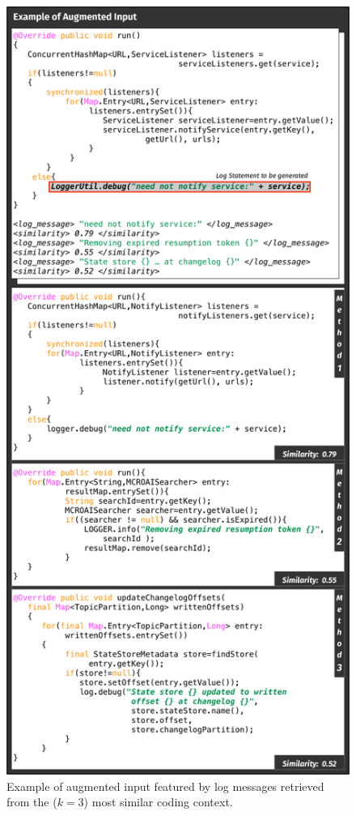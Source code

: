 \begin{figure}[h!]
	\label{fig:ir-example}
	\includegraphics[width=\columnwidth]{img/ir-example.pdf}
	\caption{Example of augmented input featured by log messages retrieved from the ($k=3$) most similar coding context.}
\end{figure}

